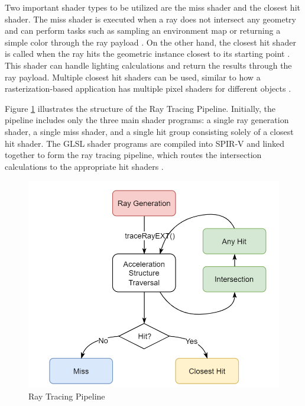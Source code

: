 \documentclass[conference]{IEEEtran}
\begin{document}
Two important shader types to be utilized are the miss shader and the closest hit shader. The miss shader is executed when a ray does not intersect any geometry and can perform tasks such as sampling an environment map or returning a simple color through the ray payload \cite{NVIDIA_Vulkan_Ray_Tracing_Tutorial}. On the other hand, the closest hit shader is called when the ray hits the geometric instance closest to its starting point \cite{NVIDIA_Vulkan_Ray_Tracing_Tutorial}. This shader can handle lighting calculations and return the results through the ray payload. Multiple closest hit shaders can be used, similar to how a rasterization-based application has multiple pixel shaders for different objects \cite{NVIDIA_Vulkan_Ray_Tracing_Tutorial}.

Figure \ref{pipeline} illustrates the structure of the Ray Tracing Pipeline. Initially, the pipeline includes only the three main shader programs: a single ray generation shader, a single miss shader, and a single hit group consisting solely of a closest hit shader. The GLSL shader programs are compiled into SPIR-V and linked together to form the ray tracing pipeline, which routes the intersection calculations to the appropriate hit shaders \cite{NVIDIA_Vulkan_Ray_Tracing_Tutorial}.

\begin{figure}[h]
    \centering
    \includegraphics[scale=0.45]{figures/Ray_tracing_pipeline.png}
    \caption{Ray Tracing Pipeline \cite{NVIDIA_Vulkan_Ray_Tracing_Tutorial}}
    \label{pipeline}
\end{figure}
\end{document}
